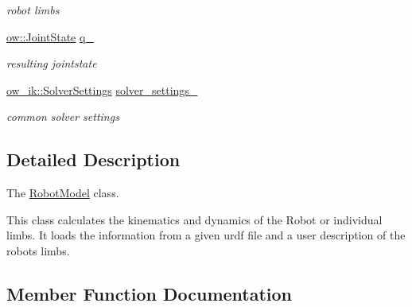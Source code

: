 \begin{DoxyCompactItemize}
\begin{DoxyCompactList}\small\item\em robot limbs \end{DoxyCompactList}\item 
\hyperlink{classow__core_1_1JointState}{ow\+::\+Joint\+State} \hyperlink{classow__ik_1_1RobotModel_ae0ce0a5efcb80e77e40e10ba81a49c67}{q\+\_\+}\hypertarget{classow__ik_1_1RobotModel_ae0ce0a5efcb80e77e40e10ba81a49c67}{}\label{classow__ik_1_1RobotModel_ae0ce0a5efcb80e77e40e10ba81a49c67}

\begin{DoxyCompactList}\small\item\em resulting jointstate \end{DoxyCompactList}\item 
\hyperlink{classow__ik_1_1SolverSettings}{ow\+\_\+ik\+::\+Solver\+Settings} \hyperlink{classow__ik_1_1RobotModel_a2ddd0fe8844edd38f51cb2c8c721a823}{solver\+\_\+settings\+\_\+}\hypertarget{classow__ik_1_1RobotModel_a2ddd0fe8844edd38f51cb2c8c721a823}{}\label{classow__ik_1_1RobotModel_a2ddd0fe8844edd38f51cb2c8c721a823}

\begin{DoxyCompactList}\small\item\em common solver settings \end{DoxyCompactList}\end{DoxyCompactItemize}


\subsection{Detailed Description}
The \hyperlink{classow__ik_1_1RobotModel}{Robot\+Model} class. 

This class calculates the kinematics and dynamics of the Robot or individual limbs. It loads the information from a given urdf file and a user description of the robots limbs. 

\subsection{Member Function Documentation}
